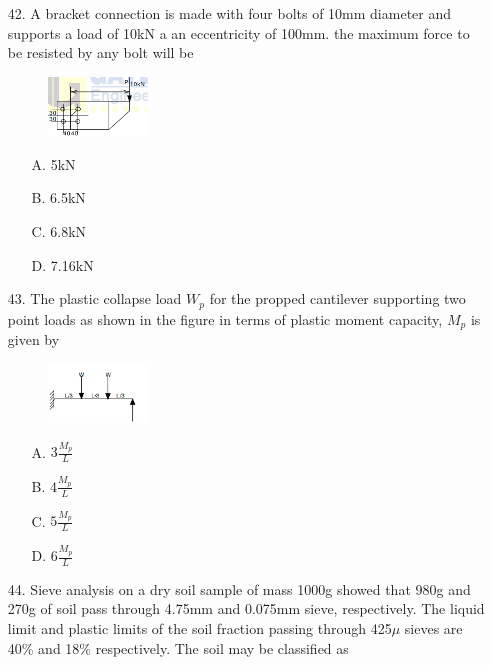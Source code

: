 \documentclass[journal]{IEEEtran}
\begin{document}
\begin{enumerate}
  \item[42.] A bracket connection is made with four bolts of 10mm diameter and supports a
  load of 10kN a an eccentricity of 100mm. the maximum force to be resisted by
  any bolt will be 
  \begin{figure}[h!]
    \centering
    \includegraphics[width=0.25\textwidth]{figs/Fig_4.png}  %
    \label{fig:sample4}
\end{figure}
  \begin{enumerate}
    \item [A.] 5kN
    \item [B.] 6.5kN
    \item [C.] 6.8kN
    \item [D.] 7.16kN
  \end{enumerate}
  \item [43.] The plastic collapse load $W_p$ for the propped cantilever supporting two point loads
  as shown in the figure in terms of plastic moment capacity, $M_p$ is given by 
  \begin{figure}[h!]
    \centering
    \includegraphics[width=0.25\textwidth]{figs/Fig_5.png}  %
    \label{fig:sample5}
\end{figure}
  \begin{enumerate}
    \item [A.] $3\frac{M_p}{L}$
    \item [B.] $4\frac{M_p}{L}$
    \item [C.] $5\frac{M_p}{L}$
    \item [D.] $6\frac{M_p}{L}$
  \end{enumerate}
  \item [44.] Sieve analysis on a dry soil sample of mass 1000g showed that 980g and 270g of
  soil pass through 4.75mm and 0.075mm sieve, respectively. The liquid limit and
  plastic limits of the soil fraction passing through 425$\mu$ sieves are 40\% and 18\%
  respectively. The soil may be classified as 
  \begin{enumerate}

\end{enumerate}
\end{enumerate}
\end{document}
